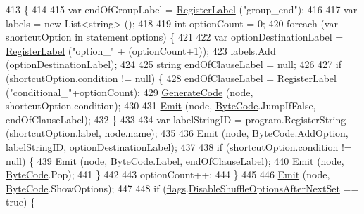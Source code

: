 \begin{DoxyCode}
413                                                                            \{
414 
415             var endOfGroupLabel = \hyperlink{a00029_a1bae0d8b701a59708641aa36ea971fa5}{RegisterLabel} (\textcolor{stringliteral}{"group\_end"});
416 
417             var labels = \textcolor{keyword}{new} List<string> ();
418 
419             \textcolor{keywordtype}{int} optionCount = 0;
420             \textcolor{keywordflow}{foreach} (var shortcutOption \textcolor{keywordflow}{in} statement.options) \{
421 
422                 var optionDestinationLabel = \hyperlink{a00029_a1bae0d8b701a59708641aa36ea971fa5}{RegisterLabel} (\textcolor{stringliteral}{"option\_"} + (optionCount+1));
423                 labels.Add (optionDestinationLabel);
424 
425                 \textcolor{keywordtype}{string} endOfClauseLabel = null;
426 
427                 \textcolor{keywordflow}{if} (shortcutOption.condition != null) \{
428                     endOfClauseLabel = \hyperlink{a00029_a1bae0d8b701a59708641aa36ea971fa5}{RegisterLabel} (\textcolor{stringliteral}{"conditional\_"}+optionCount);
429                     \hyperlink{a00029_a006f3becd521cc179ba3d3352f6f930b}{GenerateCode} (node, shortcutOption.condition);
430 
431                     \hyperlink{a00029_a774e8c143cdda0584fcfdda98626a83c}{Emit} (node, \hyperlink{a00026_ad5dfb6ee68ca7469623ad3e459f98894}{ByteCode}.JumpIfFalse, endOfClauseLabel);
432                 \}
433 
434                 var labelStringID = program.RegisterString (shortcutOption.label, node.name);
435 
436                 \hyperlink{a00029_a774e8c143cdda0584fcfdda98626a83c}{Emit} (node, \hyperlink{a00026_ad5dfb6ee68ca7469623ad3e459f98894}{ByteCode}.AddOption, labelStringID, optionDestinationLabel);
437 
438                 \textcolor{keywordflow}{if} (shortcutOption.condition != null) \{
439                     \hyperlink{a00029_a774e8c143cdda0584fcfdda98626a83c}{Emit} (node, \hyperlink{a00026_ad5dfb6ee68ca7469623ad3e459f98894}{ByteCode}.Label, endOfClauseLabel);
440                     \hyperlink{a00029_a774e8c143cdda0584fcfdda98626a83c}{Emit} (node, \hyperlink{a00026_ad5dfb6ee68ca7469623ad3e459f98894}{ByteCode}.Pop);
441                 \}
442 
443                 optionCount++;
444             \}
445 
446             \hyperlink{a00029_a774e8c143cdda0584fcfdda98626a83c}{Emit} (node, \hyperlink{a00026_ad5dfb6ee68ca7469623ad3e459f98894}{ByteCode}.ShowOptions);
447 
448             \textcolor{keywordflow}{if} (\hyperlink{a00029_a541022d89bcf9bc8f794eb6d6b438d08}{flags}.\hyperlink{a00029_a8b49bb7763ff477cba21d7c771ef3ed0}{DisableShuffleOptionsAfterNextSet} == \textcolor{keyword}{true}) \{

\end{DoxyCode}
